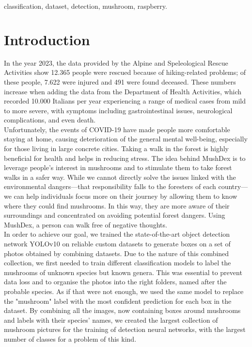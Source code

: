 \documentclass[conference]{IEEEtran}
\begin{document}
\begin{IEEEkeywords}
classification, dataset, detection, mushroom, raspberry.
\end{IEEEkeywords}

\section{Introduction}
In the year 2023, the data provided by the Alpine and Speleological Rescue Activities show 12.365 people were rescued because of hiking-related problems; of these people, 7.622 were injured and 491 were found deceased\cite{CNSAS}. These numbers increase when adding the data from the Department of Health Activities, which recorded 10.000 Italians per year experiencing a range of medical cases from mild to more severe, with symptoms including gastrointestinal issues, neurological complications, and even death.\\
Unfortunately, the events of COVID-19 have made people more comfortable staying at home, causing deterioration of the general mental well-being, especially for those living in large concrete cities. Taking a walk in the forest is highly beneficial for health and helps in reducing stress. The idea behind MushDex is to leverage people's interest in mushrooms and to stimulate them to take forest walks in a safer way. While we cannot directly solve the issues linked with the environmental dangers—that responsibility falls to the foresters of each country—we can help individuals focus more on their journey by allowing them to know where they could find mushrooms. In this way, they are more aware of their surroundings and concentrated on avoiding potential forest dangers. Using MushDex, a person can walk free of negative thoughts.\\
In order to achieve our goal, we trained the state-of-the-art object detection network YOLOv10\cite{wang2024yolov10} on reliable custom datasets to generate boxes on a set of photos obtained by combining datasets. Due to the nature of this combined collection, we first needed to train different classification models to label the mushrooms of unknown species but known genera. This was essential to prevent data loss and to organise the photos into the right folders, named after the probable species. As if that were not enough, we used the same model to replace the "mushroom" label with the most confident prediction for each box in the dataset. By combining all the images, now containing boxes around mushrooms and labels with their species' names, we created the largest collection of mushroom pictures for the training of detection neural networks, with the largest number of classes for a problem of this kind.\\
\end{document}
